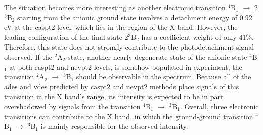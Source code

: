 \begin{refsection}
The situation becomes more interesting as another electronic transition $^4$B$_1$ $\longrightarrow$ 2$^3$B$_2$ starting from the anionic ground state involves a detachment energy of 0.92 eV at the \acrshort{caspt2} level, which lies in the region of the X band. However, the leading configuration of the final state 2$^3$B$_2$ has a coefficient weight of only 41\%. Therefore, this state does not strongly contribute to the photodetachment signal observed. If the $^2$A$_2$ state, another nearly degenerate state of the anionic state $^4$B$_1$ at both \acrshort{caspt2} and \acrshort{nevpt2} levels, is somehow populated in experiment, the transition $^2$A$_2$ $\longrightarrow$ $^3$B$_1$ should be observable in the spectrum. Because all of the \acrshort{ade}s and \acrshort{vde}s predicted by \acrshort{caspt2} and \acrshort{nevpt2} methods place signals of this transition in the X band's range, its intensity is expected to be in part overshadowed by signals from the transition $^4$B$_1$ $\longrightarrow$ $^3$B$_1$. Overall, three electronic transitions can contribute to the X band, in which the ground-ground transition $^4$B$_1$ $\longrightarrow$ $^3$B$_1$ is mainly responsible for the observed intensity.






\end{refsection}
